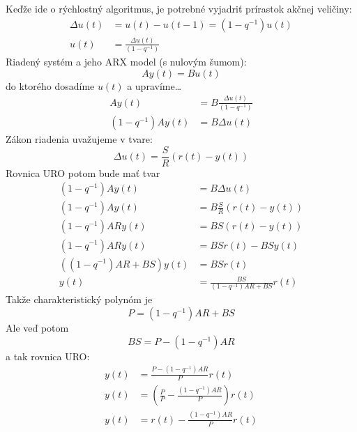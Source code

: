 \documentclass[a4paper, 10pt, ]{article}
\begin{document}
\noindent
Keďže ide o rýchlostný algoritmus, je potrebné vyjadriť prírastok akčnej veličiny:
\begin{align}
	 \Delta u(t) &= u(t) - u(t-1) = (1 - q^{-1})u(t) \\
	 u(t) &= \frac{\Delta u(t)}{(1 - q^{-1})}
\end{align}
Riadený systém a jeho ARX model (s nulovým šumom):
\begin{equation}
	Ay(t) = Bu(t)
\end{equation}
do ktorého dosadíme $u(t)$ a upravíme\ldots
\begin{subequations}
	\begin{align}
		 Ay(t) &= B\frac{\Delta u(t)}{(1 - q^{-1})} \\
		 (1 - q^{-1})Ay(t) &= B\Delta u(t)
	\end{align}
\end{subequations}
Zákon riadenia uvažujeme v tvare:
\begin{equation}
	\Delta u(t) = \frac{S}{R}(r(t) - y(t))
\end{equation}
Rovnica URO potom bude mať tvar
\begin{subequations}
	\begin{align}
		 (1 - q^{-1})Ay(t) &= B\Delta u(t) \\
		 (1 - q^{-1})Ay(t) & = B \frac{S}{R}(r(t) - y(t)) \\
		 (1 - q^{-1})ARy(t) &= BS(r(t) - y(t)) \\
		 (1 - q^{-1})ARy(t) &= BSr(t) - BSy(t) \\
		 ((1-q^{-1})AR + BS) y(t) &= BSr(t) \\
		 y(t) &= \frac{BS}{(1-q^{-1})AR + BS}r(t)
	\end{align}
\end{subequations}
Takže charakteristický polynóm je
\begin{equation}
	P = \left( 1 - q^{-1} \right) AR + BS
\end{equation}
Ale veď potom
\begin{equation}
	BS = P - \left( 1 - q^{-1} \right)AR
\end{equation}
a tak rovnica URO:
\begin{subequations}
	\begin{align}
		y(t) &= \frac{P - (1-q^{-1})AR}{P}r(t) \\
		y(t) &=\left({\frac{P}{P} -  \frac{(1-q^{-1})AR}{P}}\right)r(t) \\
		y(t) &= r(t) -  \frac{(1-q^{-1})AR}{P}r(t)
	\end{align}
\end{subequations}
\end{document}

